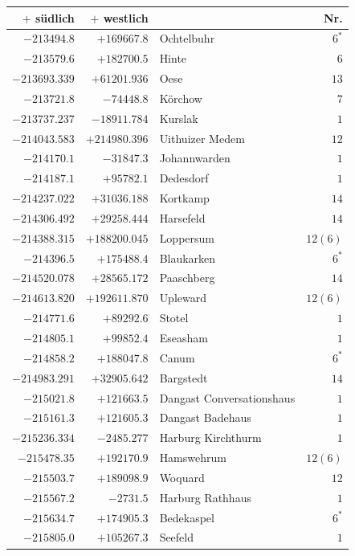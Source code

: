 \clearpage{}%
\begin{center}\begingroup\fontsize{8}{9}\selectfont
\setlength{\tabcolsep}{4pt}
\begin{tabular}{r|r|p{170pt}|r}\hline
\(+\) südlich&\(+\) westlich&&Nr.\\\hline
\(-213494.8\)&\(+169667.8\)&Ochtelbuhr&\(6^{*}\)\\
\(-213579.6\)&\(+182700.5\)&Hinte&\(6\)\\
\(-213693.339\)&\(+61201.936\)&Oese&\(13\)\\
\(-213721.8\)&\(-74448.8\)&Körchow&\(7\)\\
\(-213737.237\)&\(-18911.784\)&Kurslak&\(1\)\\
\(-214043.583\)&\(+214980.396\)&Uithuizer Medem&\(12\)\\
\(-214170.1\)&\(-31847.3\)&Johannwarden&\(1\)\\
\(-214187.1\)&\(+95782.1\)&Dedesdorf&\(1\)\\
\(-214237.022\)&\(+31036.188\)&Kortkamp&\(14\)\\
\(-214306.492\)&\(+29258.444\)&Harsefeld&\(14\)\\
\(-214388.315\)&\(+188200.045\)&Loppersum&\(12 (6)\)\\
\(-214396.5\)&\(+175488.4\)&Blaukarken&\(6^{*}\)\\
\(-214520.078\)&\(+28565.172\)&Paaschberg&\(14\)\\
\(-214613.820\)&\(+192611.870\)&Upleward&\(12 (6)\)\\
\(-214771.6\)&\(+89292.6\)&Stotel&\(1\)\\
\(-214805.1\)&\(+99852.4\)&Eseasham&\(1\)\\
\(-214858.2\)&\(+188047.8\)&Canum&\(6^{*}\)\\
\(-214983.291\)&\(+32905.642\)&Bargstedt&\(14\)\\
\(-215021.8\)&\(+121663.5\)&Dangast Conversationshaus&\(1\)\\
\(-215161.3\)&\(+121605.3\)&Dangast Badehaus&\(1\)\\
\(-215236.334\)&\(-2485.277\)&Harburg Kirchthurm&\(1\)\\
\(-215478.35\)&\(+192170.9\)&Hamswehrum&\(12 (6)\)\\
\(-215503.7\)&\(+189098.9\)&Woquard&\(12\)\\
\(-215567.2\)&\(-2731.5\)&Harburg Rathhaus&\(1\)\\
\(-215634.7\)&\(+174905.3\)&Bedekaspel&\(6^{*}\)\\
\(-215805.0\)&\(+105267.3\)&Seefeld&\(1\)\\

\end{tabular}
\end{center}

